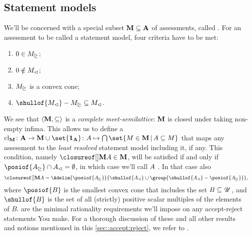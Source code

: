 \documentclass[preprint]{isipta2025}
\begin{document}
\subsection{Statement models}\label{sec::statement:models}
We'll be concerned with a special subset \(\mathbf{M}\subseteq\mathbf{A}\) of assessments, called .
For an assessment to be called a statement model, four criteria have to be met:
\begin{enumerate}[label={\upshape M\arabic*.},ref={\upshape M\arabic*},series=AR,widest=4,leftmargin=*,itemsep=0pt]
\item\label{axiom:model:background:respected} \(0\in M_\trianglerighteq\);
\item\label{axiom:model:null:not:rejected} \(0\notin M_\vartriangleleft\);
\item\label{axiom:model:accepts:convex:cone} \(M_\trianglerighteq\) is a convex cone;
\item\label{axiom:model:no:limbo} \(\shullof{\M_\rej}-\M_\acc\subseteq\M_\rej\).
\end{enumerate}
We see that \(\langle\mathbf{M},\subseteq\rangle\) is a \emph{complete meet-semilattice}: \(\mathbf{M}\) is closed under taking non-empty infima.
This allows us to define a ~\(\Mcls\colon\As\to\Ms\cup\set{\Astop}\colon\A\mapsto\Intersection\set{\M\in\Ms\given\A\subseteq\M}\) that maps any assessment to the \emph{least resolved} statement model including it, if any.
This condition, namely \(\Mclsof{\A}\in\Ms\), will be satisfied if and only if \(\posiof{\A_\acc}\cap\A_\rej=\emptyset\), in which case we'll call \(A\) .
In that case also
\begin{equation}\label{eq:model:closure}
\Mclsof{\A}
=\Adelim{\posiof{\A_\acc}}{\shullof{\A_\rej}\cup\group{\shullof{\A_\rej}-\posiof{\A_\acc}}},
\end{equation}
where \(\posiof{B}\) is the smallest convex cone that includes the set \(B\subseteq\mathscr{U}\), and \(\shullof{B}\) is the set of all (strictly) positive scalar multiples of the elements of \(B\).
 are the minimal rationality requirements we'll impose on any accept-reject statements You make.
For a thorough discussion of these and all other results and notions mentioned in this \cref{sec::accept:reject}, we refer to \cite{quaeghebeur2015:statement}.
\end{document}
